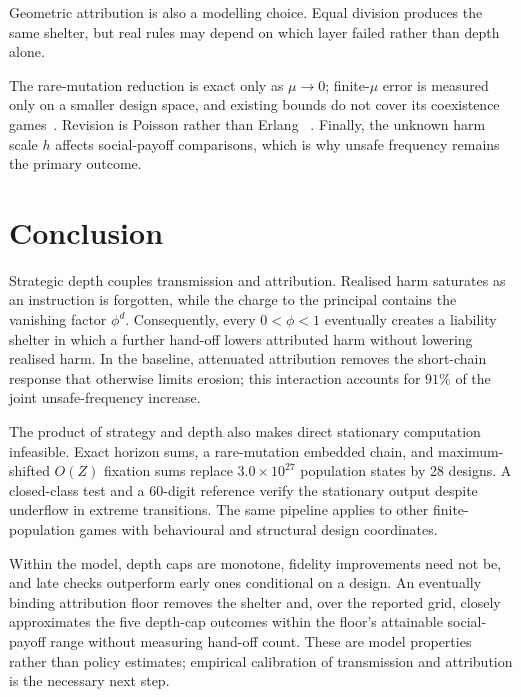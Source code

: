 \documentclass[a4paper,fleqn]{cas-sc}
\begin{document}
Geometric attribution is also a modelling choice. Equal division produces the
same shelter, but real rules may depend on which layer failed rather than depth
alone.

The rare-mutation reduction is exact only as $\mu\to0$; finite-$\mu$ error is
measured only on a smaller design space, and existing bounds do not cover its
coexistence games~\citep{wu2012howsmall}. Revision is Poisson rather than Erlang
~\citep{kara2022erlang}. Finally, the unknown harm scale $h$ affects
social-payoff comparisons, which is why unsafe frequency remains the primary
outcome.

\section{Conclusion}
\label{sec:conclusion}

Strategic depth couples transmission and attribution. Realised harm saturates
as an instruction is forgotten, while the charge to the principal contains the
vanishing factor $\phi^d$. Consequently, every $0<\phi<1$ eventually creates a
liability shelter in which a further hand-off lowers attributed harm without
lowering realised harm. In the baseline, attenuated attribution removes the
short-chain response that otherwise limits erosion; this interaction accounts
for $91\%$ of the joint unsafe-frequency increase.

The product of strategy and depth also makes direct stationary computation
infeasible. Exact horizon sums, a rare-mutation embedded chain, and
maximum-shifted $O(Z)$ fixation sums replace $3.0\times10^{27}$ population
states by 28 designs. A closed-class test and a 60-digit reference verify the
stationary output despite underflow in extreme transitions. The same pipeline
applies to other finite-population games with behavioural and structural design
coordinates.

Within the model, depth caps are monotone, fidelity improvements need not be,
and late checks outperform early ones conditional on a design. An eventually
binding attribution floor removes the shelter and, over the reported grid,
closely approximates the five depth-cap outcomes within the floor's attainable
social-payoff range without measuring hand-off count. These are
model properties rather than policy estimates; empirical calibration of
transmission and attribution is the necessary next step.

\end{document}
